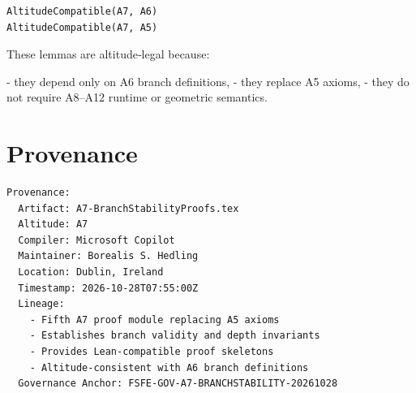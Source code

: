 \documentclass[11pt]{article}
\begin{document}
\begin{verbatim}
AltitudeCompatible(A7, A6)
AltitudeCompatible(A7, A5)
\end{verbatim}

These lemmas are altitude‑legal because:

- they depend only on A6 branch definitions,
- they replace A5 axioms,
- they do not require A8–A12 runtime or geometric semantics.

\newpage


\section*{Provenance}

\begin{verbatim}
Provenance:
  Artifact: A7-BranchStabilityProofs.tex
  Altitude: A7
  Compiler: Microsoft Copilot
  Maintainer: Borealis S. Hedling
  Location: Dublin, Ireland
  Timestamp: 2026-10-28T07:55:00Z
  Lineage:
    - Fifth A7 proof module replacing A5 axioms
    - Establishes branch validity and depth invariants
    - Provides Lean-compatible proof skeletons
    - Altitude-consistent with A6 branch definitions
  Governance Anchor: FSFE-GOV-A7-BRANCHSTABILITY-20261028
\end{verbatim}
\end{document}
